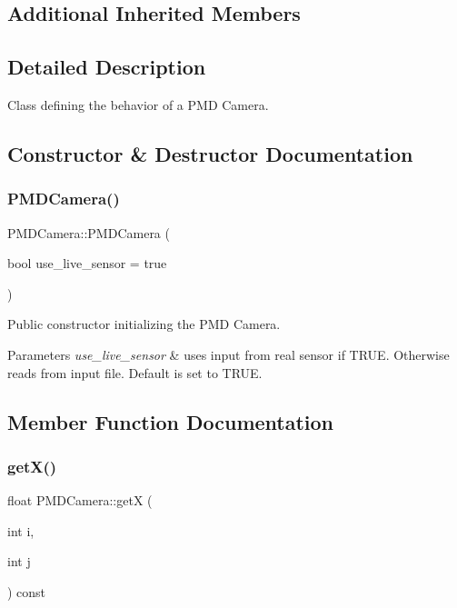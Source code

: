 \subsection*{Additional Inherited Members}


\subsection{Detailed Description}
Class defining the behavior of a P\+MD Camera. 

\subsection{Constructor \& Destructor Documentation}
\hypertarget{class_p_m_d_camera_a9965c089ec7eea8537e249d432c1dbba}{}\label{class_p_m_d_camera_a9965c089ec7eea8537e249d432c1dbba} 
\subsubsection{\texorpdfstring{P\+M\+D\+Camera()}{PMDCamera()}}
{\footnotesize\ttfamily P\+M\+D\+Camera\+::\+P\+M\+D\+Camera (\begin{DoxyParamCaption}\item[{bool}]{use\+\_\+live\+\_\+sensor = {\ttfamily true} }\end{DoxyParamCaption})}



Public constructor initializing the P\+MD Camera. 


\begin{DoxyParams}{Parameters}
{\em use\+\_\+live\+\_\+sensor} & uses input from real sensor if T\+R\+UE. Otherwise reads from input file. Default is set to T\+R\+UE. \\
\hline
\end{DoxyParams}


\subsection{Member Function Documentation}
\hypertarget{class_p_m_d_camera_a6d5662f8c84cb9c12ad71a70159a6f3a}{}\label{class_p_m_d_camera_a6d5662f8c84cb9c12ad71a70159a6f3a} 
\subsubsection{\texorpdfstring{get\+X()}{getX()}}
{\footnotesize\ttfamily float P\+M\+D\+Camera\+::getX (\begin{DoxyParamCaption}\item[{int}]{i,  }\item[{int}]{j }\end{DoxyParamCaption}) const\hspace{0.3cm}{\ttfamily [private]}}



